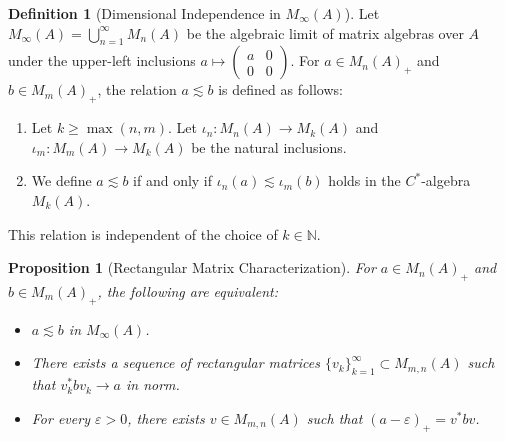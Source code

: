 \documentclass[12pt]{amsart}
\theoremstyle{plain}
\newtheorem{prop}[thm]{Proposition}
\theoremstyle{definition}
\newtheorem{defn}[thm]{Definition}
\numberwithin{equation}{section}
\begin{document}
\begin{defn}[Dimensional Independence in $M_{\infty}(A)$]
Let $M_{\infty}(A) = \bigcup_{n=1}^{\infty} M_n(A)$ be the algebraic limit of matrix algebras over $A$ under the upper-left inclusions $a \mapsto \begin{pmatrix}  a & 0 \\ 0 & 0 \end{pmatrix}$. For $a \in M_n(A)_+$ and $b \in M_m(A)_+$, the relation $a \lesssim b$ is defined as follows:
\begin{enumerate}
    \item Let $k \ge \max(n, m)$. Let $\iota_n: M_n(A) \to M_k(A)$ and $\iota_m: M_m(A) \to M_k(A)$ be the natural inclusions.
    \item We define $a \lesssim b$ if and only if $\iota_n(a) \lesssim \iota_m(b)$ holds in the $C^*$-algebra $M_k(A)$.
\end{enumerate}
This relation is independent of the choice of $k \in \mathbb{N}$.
\end{defn}

\begin{prop}[Rectangular Matrix Characterization]
For $a \in M_n(A)_+$ and $b \in M_m(A)_+$, the following are equivalent:
\begin{itemize}
    \item $a \lesssim b$ in $M_{\infty}(A)$.
    \item There exists a sequence of rectangular matrices $\{v_k\}_{k=1}^{\infty} \subset M_{m,n}(A)$ such that $v_k^* b v_k \to a$ in norm.
    \item For every $\varepsilon > 0$, there exists $v \in M_{m,n}(A)$ such that $(a - \varepsilon)_+ = v^* b v$.
\end{itemize}
\end{prop}
\end{document}
